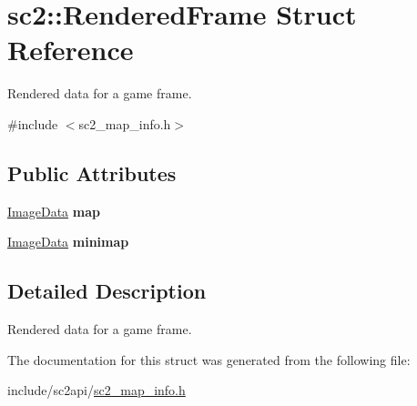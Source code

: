 \hypertarget{structsc2_1_1_rendered_frame}{}\section{sc2\+:\+:Rendered\+Frame Struct Reference}
\label{structsc2_1_1_rendered_frame}


Rendered data for a game frame.  




{\ttfamily \#include $<$sc2\+\_\+map\+\_\+info.\+h$>$}

\subsection*{Public Attributes}
\begin{DoxyCompactItemize}
\item 
\mbox{\label{structsc2_1_1_rendered_frame_a325d64c97bc35d7f7042119ecce40b16}} 
\hyperlink{structsc2_1_1_image_data}{Image\+Data} {\bfseries map}
\item 
\mbox{\label{structsc2_1_1_rendered_frame_a6b769abd23fbe130d2b6fb0779c5dd8f}} 
\hyperlink{structsc2_1_1_image_data}{Image\+Data} {\bfseries minimap}
\end{DoxyCompactItemize}


\subsection{Detailed Description}
Rendered data for a game frame. 

The documentation for this struct was generated from the following file\+:\begin{DoxyCompactItemize}
\item 
include/sc2api/\hyperlink{sc2__map__info_8h}{sc2\+\_\+map\+\_\+info.\+h}\end{DoxyCompactItemize}
